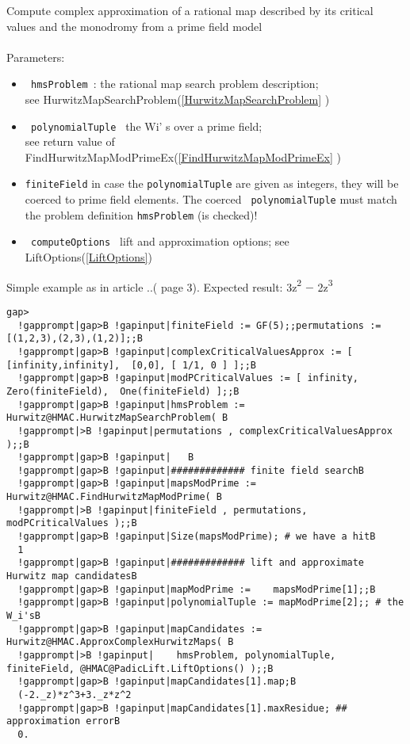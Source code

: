 \documentclass[a4paper,11pt]{report}
\begin{document}
{{{ Compute complex approximation of a rational map described by its critical
values and the monodromy from a prime field model \\
 \\
 Parameters: 
\begin{itemize}
\item \texttt{ hmsProblem }: the rational map search problem description; \\
 see HurwitzMapSearchProblem(\ref{HurwitzMapSearchProblem} ) 
\item \texttt{ polynomialTuple } the W{\textunderscore}i' s over a prime field; \\
 see return value of FindHurwitzMapModPrimeEx(\ref{FindHurwitzMapModPrimeEx} ) 
\item \texttt{finiteField} in case the \texttt{polynomialTuple} are given as integers, they will be coerced to prime field elements. The
coerced \texttt{ polynomialTuple} must match the problem definition \texttt{hmsProblem} (is checked)! 
\item \texttt{ computeOptions } lift and approximation options; see LiftOptions(\ref{LiftOptions}) 
\end{itemize}
 }

 Simple example as in article ..( page 3). Expected result:
3z{\textsuperscript2} {\ensuremath{-}} 2z{\textsuperscript3} \\
 
\begin{Verbatim}[commandchars=!|B,fontsize=\small,frame=single,label=Example]
  gap>
  !gapprompt|gap>B !gapinput|finiteField := GF(5);;permutations := [(1,2,3),(2,3),(1,2)];;B
  !gapprompt|gap>B !gapinput|complexCriticalValuesApprox := [ [infinity,infinity],  [0,0], [ 1/1, 0 ] ];;B
  !gapprompt|gap>B !gapinput|modPCriticalValues := [ infinity, Zero(finiteField),  One(finiteField) ];;B
  !gapprompt|gap>B !gapinput|hmsProblem := Hurwitz@HMAC.HurwitzMapSearchProblem( B
  !gapprompt|>B !gapinput|permutations , complexCriticalValuesApprox );;B
  !gapprompt|gap>B !gapinput|	B
  !gapprompt|gap>B !gapinput|############# finite field searchB
  !gapprompt|gap>B !gapinput|mapsModPrime := Hurwitz@HMAC.FindHurwitzMapModPrime( B
  !gapprompt|>B !gapinput|finiteField , permutations, modPCriticalValues );;B
  !gapprompt|gap>B !gapinput|Size(mapsModPrime); # we have a hitB
  1
  !gapprompt|gap>B !gapinput|############# lift and approximate Hurwitz map candidatesB
  !gapprompt|gap>B !gapinput|mapModPrime :=    mapsModPrime[1];;B
  !gapprompt|gap>B !gapinput|polynomialTuple := mapModPrime[2];; # the W_i'sB
  !gapprompt|gap>B !gapinput|mapCandidates := Hurwitz@HMAC.ApproxComplexHurwitzMaps( B
  !gapprompt|>B !gapinput|    hmsProblem, polynomialTuple, finiteField, @HMAC@PadicLift.LiftOptions() );;B
  !gapprompt|gap>B !gapinput|mapCandidates[1].map;B
  (-2._z)*z^3+3._z*z^2 
  !gapprompt|gap>B !gapinput|mapCandidates[1].maxResidue; ## approximation errorB
  0.
\end{Verbatim}
 }

 }
\end{document}
